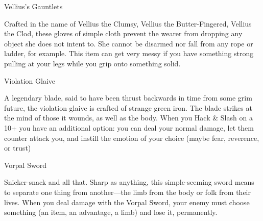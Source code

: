  

Vellius’s Gauntlets	 

 

Crafted in the name of Vellius the Clumsy, Vellius the Butter-Fingered, Vellius the Clod, these gloves of simple cloth prevent the wearer from dropping any object she does not intent to. She cannot be disarmed nor fall from any rope or ladder, for example. This item can get very messy if you have something strong pulling at your legs while you grip onto something solid.

 

Violation Glaive	 

 

A legendary blade, said to have been thrust backwards in time from some grim future, the violation glaive is crafted of strange green iron. The blade strikes at the mind of those it wounds, as well as the body. When you Hack \& Slash on a 10+ you have an additional option: you can deal your normal damage, let them counter attack you, and instill the emotion of your choice (maybe fear, reverence, or trust)

 

Vorpal Sword	 

 

Snicker-snack and all that. Sharp as anything, this simple-seeming sword means to separate one thing from another—the limb from the body or folk from their lives. When you deal damage with the Vorpal Sword, your enemy must choose something (an item, an advantage, a limb) and lose it, permanently.



 



 
